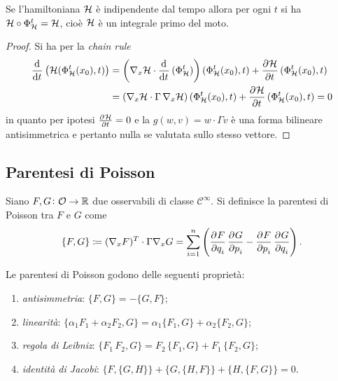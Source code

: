 \begin{thm}
    Se l'hamiltoniana $ \mathcal{H} $ è indipendente dal tempo allora per ogni $ t $ si ha $ \mathcal{H} \circ \Phi_{\mathcal{H}}^t = \mathcal{H} $, cioè $ \mathcal{H} $ è un integrale primo del moto.
\end{thm}
\begin{proof}
    Si ha per la \emph{chain rule}
    \begin{align*}
        \dod{}{t} \left(\ham(\Phi_\ham^t(x_0), t)\right) & = \left(\nabla_x \ham \cdot \dod{}{t}(\Phi^t_\ham)\right)(\Phi^t_\ham(x_0), t) + \dpd{\ham}{t}(\Phi_\ham^t(x_0), t) \\
        & = \left(\nabla_x \ham \cdot \Gamma \, \nabla_x \ham\right)(\Phi^t_\ham(x_0), t) + \dpd{\ham}{t}(\Phi_\ham^t(x_0), t) = 0
    \end{align*}
    in quanto per ipotesi $ \pd{\ham}{t} = 0 $ e la $ g(w, v) = w \cdot \Gamma v $ è una forma bilineare antisimmetrica e pertanto nulla se valutata sullo stesso vettore.
\end{proof}

\subsection{Parentesi di Poisson}
\begin{definition}
    Siano $ F, G \colon \mathcal{O} \to \mathbb{R} $ due osservabili di classe $ \mathcal{C}^\infty $. Si definisce la parentesi di Poisson tra $ F $ e $ G $ come
    \begin{equation}
        \left\{F, G\right\} \coloneqq (\nabla_x F)^T \cdot \Gamma \nabla_x G = \sum_{i=1}^{n} \left(\dpd{F}{q_i} \dpd{G}{p_i} - \dpd{F}{p_i}\dpd{G}{q_i}\right).
    \end{equation}
\end{definition}

\begin{proposition}
    Le parentesi di Poisson godono delle seguenti proprietà:
    \begin{enumerate}[label=(\roman*)]
        \item \emph{antisimmetria}: $ \{F, G\} = - \{G, F\} $;
        \item \emph{linearità}: $ \{\alpha_1 F_1 + \alpha_2 F_2, G\} = \alpha_1 \{F_1, G\} + \alpha_2\{F_2, G\} $;
        \item \emph{regola di Leibniz}: $ \{F_1 \, F_2, G\} = F_2 \, \{F_1, G\} + F_1 \, \{F_2, G\} $;
        \item \emph{identità di Jacobi}: $ \{F, \{G, H\}\} + \{G, \{H, F\}\} + \{H, \{F, G\}\} = 0 $.
    \end{enumerate}
\end{proposition}

